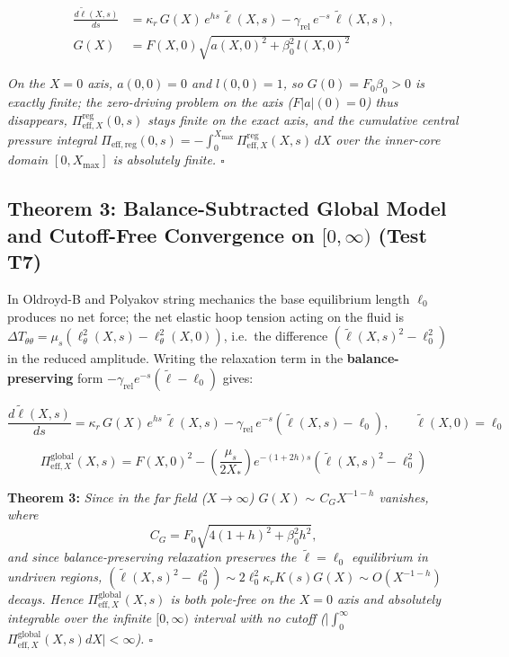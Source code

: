 \documentclass[12pt,a4paper]{article}
\begin{document}
\begin{equation}
\begin{split}
\frac{d \tilde{\ell}(X, s)}{ds} &= \kappa_r \, G(X) \, e^{h s} \, \tilde{\ell}(X, s) - \gamma_{\mathrm{rel}} \, e^{-s} \, \tilde{\ell}(X, s), \\
G(X) &= F(X, 0) \sqrt{a(X, 0)^2 + \beta_0^2 \, l(X, 0)^2}
\end{split}
\end{equation}

\textit{On the $X = 0$ axis, $a(0, 0) = 0$ and $l(0, 0) = 1$, so $G(0) = F_0 \beta_0 > 0$ is exactly finite; the zero-driving problem on the axis ($F|a|(0) = 0$) thus disappears, $\Pi_{\mathrm{eff}, X}^{\mathrm{reg}}(0, s)$ stays finite on the exact axis, and the cumulative central pressure integral $\Pi_{\mathrm{eff,reg}}(0, s) = -\int_0^{X_{\max}} \Pi_{\mathrm{eff}, X}^{\mathrm{reg}}(X, s) \, dX$ over the inner-core domain $[0, X_{\max}]$ is absolutely finite. $\square$}

\subsection{Theorem 3: Balance-Subtracted Global Model and Cutoff-Free Convergence on $[0,\infty)$ (Test T7)}

In Oldroyd-B and Polyakov string mechanics the base equilibrium length $\ell_0$ produces no net force; the net elastic hoop tension acting on the fluid is $\Delta T_{\theta\theta} = \mu_s (\ell_\theta^2(X,s) - \ell_\theta^2(X,0))$, i.e.\ the difference $(\tilde{\ell}(X,s)^2 - \ell_0^2)$ in the reduced amplitude. Writing the relaxation term in the \textbf{balance-preserving} form $-\gamma_{\mathrm{rel}} e^{-s} (\tilde{\ell} - \ell_0)$ gives:

\begin{equation}
\frac{d \tilde{\ell}(X, s)}{ds} = \kappa_r \, G(X) \, e^{h s} \, \tilde{\ell}(X, s) - \gamma_{\mathrm{rel}} \, e^{-s} \left( \tilde{\ell}(X, s) - \ell_0 \right), \qquad \tilde{\ell}(X, 0) = \ell_0
\end{equation}

\begin{equation}
\Pi_{\mathrm{eff}, X}^{\mathrm{global}}(X, s) = F(X, 0)^2 - \left( \frac{\mu_s}{2 X_*} \right) e^{-(1+2h)s} \left( \tilde{\ell}(X, s)^2 - \ell_0^2 \right)
\end{equation}

\textbf{Theorem 3:} \textit{Since in the far field ($X \to \infty$) $G(X)$ $\sim$ $C_G X^{-1-h}$ vanishes, where
\[
C_G = F_0 \sqrt{4(1+h)^2 + \beta_0^2 h^2},
\]
and since balance-preserving relaxation preserves the $\tilde{\ell} = \ell_0$ equilibrium in undriven regions, $(\tilde{\ell}(X, s)^2 - \ell_0^2) \sim 2 \ell_0^2 \kappa_r K(s) G(X) \sim O(X^{-1-h})$ decays. Hence $\Pi_{\mathrm{eff}, X}^{\mathrm{global}}(X, s)$ is both pole-free on the $X = 0$ axis and absolutely integrable over the infinite $[0, \infty)$ interval with no cutoff ($\bigg\vert{}\int_0^\infty$ $\Pi_{\mathrm{eff}, X}^{\mathrm{global}}(X, s) dX\bigg\vert{} < \infty$). $\square$}
\end{document}
